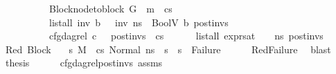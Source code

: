 \begin{isabellebody}
\ \ \ \ \ \ \ \ \ \ Block{\isacharcolon}{\kern0pt}{\isachardoublequoteopen}node{\isacharunderscore}{\kern0pt}to{\isacharunderscore}{\kern0pt}block\ G\ {\isacharbang}{\kern0pt}\ m\ {\isacharequal}{\kern0pt}\ cs{\isachardoublequoteclose}\isanewline
\ \ \ \ \ \ \ \ \ \ {\isachardoublequoteopen}list{\isacharunderscore}{\kern0pt}all\ {\isacharparenleft}{\kern0pt}{\isasymlambda}inv{\isachardot}{\kern0pt}\ {\isasymexists}b{\isachardot}{\kern0pt}\ {\isasymLambda}{\isacharcomma}{\kern0pt}{\isasymGamma}{\isacharcomma}{\kern0pt}{\isasymOmega}\ {\isasymturnstile}\ {\isasymlangle}inv{\isacharcomma}{\kern0pt}\ ns{\isasymrangle}\ {\isasymDown}\ BoolV\ b{\isacharparenright}{\kern0pt}\ post{\isacharunderscore}{\kern0pt}invs{\isachardoublequoteclose}\isanewline
\ \ \ \ \ \ \ \ \ \ {\isachardoublequoteopen}cfg{\isacharunderscore}{\kern0pt}dag{\isacharunderscore}{\kern0pt}rel\ c\ {\isacharbrackleft}{\kern0pt}{\isacharbrackright}{\kern0pt}\ {\isacharbrackleft}{\kern0pt}{\isacharbrackright}{\kern0pt}\ post{\isacharunderscore}{\kern0pt}invs\ {\isacharbrackleft}{\kern0pt}{\isacharbrackright}{\kern0pt}\ cs{\isachardoublequoteclose}\ \isanewline
\ \ \ \ \ {\isachardoublequoteopen}list{\isacharunderscore}{\kern0pt}all\ {\isacharparenleft}{\kern0pt}expr{\isacharunderscore}{\kern0pt}sat\ {\isasymLambda}\ {\isasymGamma}\ {\isasymOmega}\ ns{\isacharparenright}{\kern0pt}\ post{\isacharunderscore}{\kern0pt}invs{\isachardoublequoteclose}\isanewline
%
\isadelimproof
%
\endisadelimproof
%
\isatagproof
{}\isamarkupfalse%
\ {\isacharminus}{\kern0pt}\isanewline
\ \ \isamarkupfalse%
\ Red\ Block\ \isamarkupfalse%
\ {\isachardoublequoteopen}{\isasymAnd}\ s{}{\isacharprime}{\kern0pt}{\isachardot}{\kern0pt}\ M{\isacharcomma}{\kern0pt}{\isasymLambda}{\isacharcomma}{\kern0pt}{\isasymGamma}{\isacharcomma}{\kern0pt}{\isasymOmega}\ {\isasymturnstile}\ {\isasymlangle}cs{\isacharcomma}{\kern0pt}\ Normal\ ns{\isasymrangle}\ {\isacharbrackleft}{\kern0pt}{\isasymrightarrow}{\isacharbrackright}{\kern0pt}\ s{}{\isacharprime}{\kern0pt}\ {\isasymLongrightarrow}\ s{}{\isacharprime}{\kern0pt}\ {\isasymnoteq}\ Failure{\isachardoublequoteclose}\isanewline
\ \ \ \ \isamarkupfalse%
\ RedFailure\ \isamarkupfalse%
\ blast\isanewline
\ \ \isamarkupfalse%
\ {\isacharquery}{\kern0pt}thesis\isanewline
\ \ \ \ \isamarkupfalse%
\ cfg{\isacharunderscore}{\kern0pt}dag{\isacharunderscore}{\kern0pt}rel{\isacharunderscore}{\kern0pt}post{\isacharunderscore}{\kern0pt}invs{\isacharunderscore}{\kern0pt}{}\ assms{\isacharparenleft}{\kern0pt}{}{\isacharminus}{\kern0pt}{\isacharparenright}{\kern0pt}\isanewline

\end{isabellebody}
